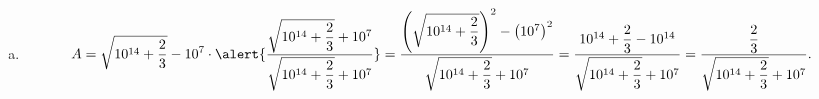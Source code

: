 \begin{frame}
\begin{solution}
\begin{enumerate}[a)]
			\item

			      \begin{equation*}
				      A=
				      \sqrt{10^{14}+\dfrac{2}{3}}-10^{7}\cdot
				      \alert{
				      \dfrac{
				      \sqrt{10^{14}+\dfrac{2}{3}}+10^{7}
				      }{
				      \sqrt{10^{14}+\dfrac{2}{3}}+10^{7}
				      }
				      }=
				      \dfrac{
				      \left(
				      \sqrt{10^{14}+\dfrac{2}{3}}
				      \right)^{2}
				      -{\left(
				      10^{7}
				      \right)}^{2}
				      }{
				      \sqrt{10^{14}+\dfrac{2}{3}}+10^{7}
				      }
				      =
				      \dfrac{
				      10^{14}+\dfrac{2}{3}-10^{14}
				      }{
				      \sqrt{10^{14}+\dfrac{2}{3}}+10^{7}
				      }=
				      \dfrac{\dfrac{2}{3}}{
				      \sqrt{10^{14}+\dfrac{2}{3}}+10^{7}
				      }.
			      \end{equation*}
		\end{enumerate}
	\end{solution}
\end{frame}
